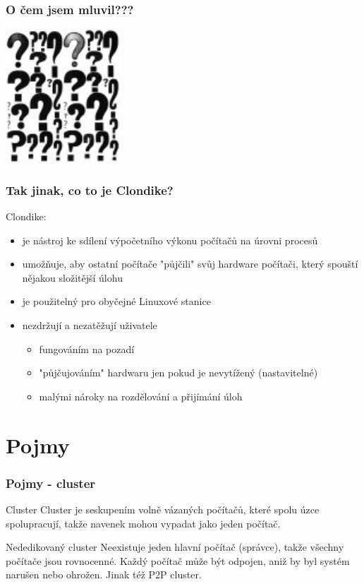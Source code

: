 \documentclass{beamer}
\begin{document}
\begin{frame}
\frametitle{O čem jsem mluvil???}
	\begin {center}
		\includegraphics[height=5cm]{otaznik}
	\end {center}
\end{frame}
\begin {frame}
\frametitle{Tak jinak, co to je Clondike?}
	Clondike:
		\begin {itemize}
			\pause
			\item je nástroj ke sdílení výpočetního výkonu počítačů na úrovni procesů
			\pause
			\item umožňuje, aby ostatní počítače "půjčili" svůj hardware počítači, který spouští nějakou složitější úlohu
			\pause
			\item je použitelný pro obyčejné Linuxové stanice
			\pause
			\item nezdržují a nezatěžují uživatele
			\begin {itemize}
				\item fungováním na pozadí
				\item "půjčujováním" hardwaru jen pokud je nevytížený (nastavitelné)
				\item malými nároky na rozdělování a přijímání úloh
			\end{itemize}
		\end{itemize}
\end {frame}


\section{Pojmy}
\begin {frame}
\frametitle {Pojmy - cluster}
	\begin {block} {Cluster}
		Cluster je seskupením volně vázaných počítačů, které spolu úzce spolupracují, takže navenek mohou vypadat jako jeden počítač.
	\end {block}
	\begin {block} {Nededikovaný cluster}
		Neexistuje jeden hlavní počítač (správce), takže všechny počítače jsou rovnocenné. Každý počítač může být odpojen, aniž by byl systém narušen nebo ohrožen. Jinak též P2P cluster.
	\end {block}
\end {frame}
\end{document}
